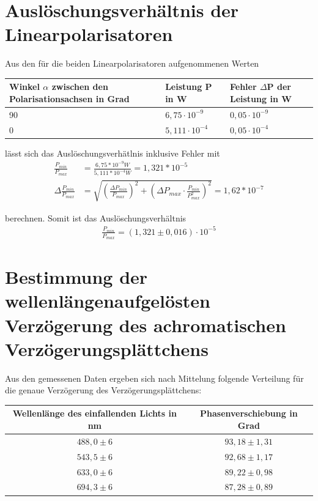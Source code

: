 \documentclass[bigchapter,colorback,accentcolor=tud4b,linedtoc,11pt]{tudreport}
\begin{document}
\section{Auslöschungsverhältnis der Linearpolarisatoren}
Aus den für die beiden Linearpolarisatoren aufgenommenen Werten
\begin{center}
  \begin{tabular}{|p{5cm}|p{4cm}|p{4.5cm}|}
    \hline
        Winkel $\alpha$ zwischen den Polarisationsachsen in Grad & Leistung P in W & Fehler $\Delta$P der Leistung in W \\ \hline
        90 & $6,75 \cdot 10^{-9}$ & $0,05 \cdot 10^{-9}$ \\ \hline
        0 & $5,111 \cdot 10^{-4}$ & $0,05 \cdot 10^{-4}$ \\ \hline
	\end{tabular}
\end{center}

lässt sich das Auslöschungsverhätlnis inklusive Fehler mit
\begin{align*}
  \frac{P_{min}}{P_{max}} &= \frac{6,75*10^{-9} W}{5,111*10^{-4} W} = 1,321*10^{-5} \\
  \Delta\frac{P_{min}}{P_{max}} &= \sqrt{\left(\frac{\Delta P_{min}}{P_{max}}\right)^2 + \left(\Delta P_{max} \cdot \frac{P_{min}}{P_{max}^2}\right)^2} = 1,62 * 10^{-7}
\end{align*}

berechnen. Somit ist das Auslöschungsverhältnis
\begin{align*}
\frac{P_{min}}{P_{max}} =\left(1,321\pm0,016\right) \cdot 10^{-5}
\end{align*}
\section{Bestimmung der wellenlängenaufgelösten Verzögerung des achromatischen Verzögerungsplättchens}

Aus den gemessenen Daten ergeben sich nach Mittelung folgende Verteilung für die genaue Verzögerung des Verzögerungsplättchens:
\begin{center}
  \begin{tabular}{|c|c|}
    \hline
        Wellenlänge des einfallenden Lichts in nm & Phasenverschiebung in Grad \\ \hline
        $488,0 \pm 6$                             & $93,18 \pm 1,31$           \\ \hline
        $543,5 \pm 6$                             & $92,68 \pm 1,17$           \\ \hline
        $633,0 \pm 6$                             & $89,22 \pm 0,98$           \\ \hline
        $694,3 \pm 6$                             & $87,28 \pm 0,89$           \\ \hline
	\end{tabular}
\end{center}
\end{document}
